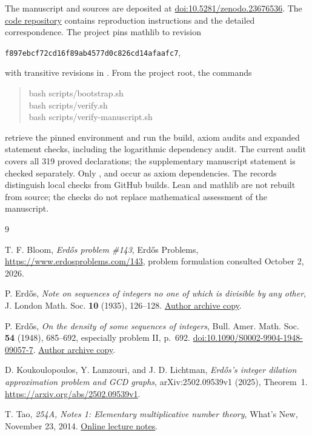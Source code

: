 \documentclass[11pt,reqno]{amsart}
\theoremstyle{definition}
\theoremstyle{remark}
\numberwithin{equation}{section}
\begin{document}
The manuscript and sources are deposited at
\href{https://doi.org/10.5281/zenodo.23676536}{doi:10.5281/zenodo.23676536}.
The \href{https://github.com/mapice/erdos-143-candidate-disproof}{code repository}
contains reproduction instructions and the detailed correspondence.
The project pins mathlib to revision
\begin{center}\small
\texttt{f897ebcf72cd16f89ab4577d0c826cd14afaafc7},
\end{center}
with transitive revisions in . From the
project root, the commands
\begin{quote}\small\ttfamily
bash scripts/bootstrap.sh\\
bash scripts/verify.sh\\
bash scripts/verify-manuscript.sh
\end{quote}
retrieve the pinned environment and run the build, axiom audits and
expanded statement checks, including the logarithmic dependency audit.
The current audit covers all 319 proved declarations; the supplementary
manuscript statement is checked separately. Only ,
 and  occur as axiom dependencies.
The records distinguish local checks from GitHub builds. Lean and
mathlib are not rebuilt from source; the checks do not replace
mathematical assessment of the manuscript.

\begin{thebibliography}{9}

T. F. Bloom, \emph{Erd\H{o}s problem \#143}, Erd\H{o}s Problems,
\url{https://www.erdosproblems.com/143}, problem formulation consulted October 2, 2026.

P. Erd\H{o}s, \emph{Note on sequences of integers no one of which is
  divisible by any other}, J. London Math. Soc. \textbf{10} (1935), 126--128.
\href{https://www.renyi.hu/~p_erdos/1935-04.pdf}{Author archive copy}.

P. Erd\H{o}s, \emph{On the density of some sequences of integers},
Bull. Amer. Math. Soc. \textbf{54} (1948), 685--692, especially problem II,
p.~692.
\href{https://doi.org/10.1090/S0002-9904-1948-09057-7}{doi:10.1090/S0002-9904-1948-09057-7}.
\href{https://www.renyi.hu/~p_erdos/1948-06.pdf}{Author archive copy}.

D. Koukoulopoulos, Y. Lamzouri, and J. D. Lichtman,
\emph{Erd\H{o}s's integer dilation approximation problem and GCD graphs},
arXiv:2502.09539v1 (2025), Theorem~1.
\url{https://arxiv.org/abs/2502.09539v1}.

T. Tao, \emph{254A, Notes 1: Elementary multiplicative number theory},
What's New, November 23, 2014.
\href{https://terrytao.wordpress.com/2014/11/23/254a-notes-1-elementary-multiplicative-number-theory/}{Online lecture notes}.

\end{thebibliography}
\end{document}
